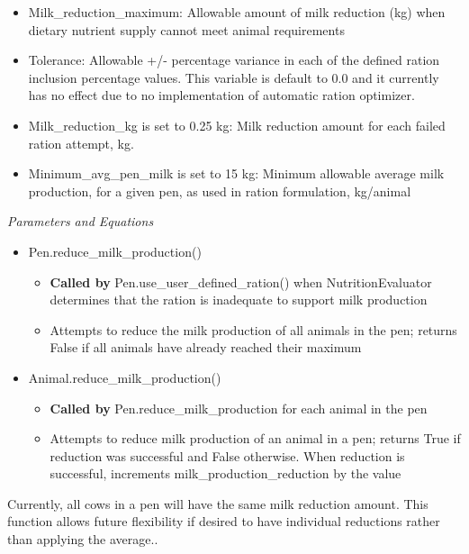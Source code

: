 \documentclass{article}
\begin{document}
\begin{refsection}
\begin{enumerate}
         \begin{itemize}
             \item Milk\_reduction\_maximum: Allowable amount of milk reduction (kg) when dietary nutrient supply cannot meet animal requirements 
             \item Tolerance: Allowable +/- percentage variance in each of the defined ration inclusion percentage values. This variable is default to 0.0 and it currently has no effect due to no implementation of automatic ration optimizer. 
            \item Milk\_reduction\_kg is set to 0.25 kg: Milk reduction amount for each failed ration attempt, kg. 
            \item Minimum\_avg\_pen\_milk is set to 15 kg: Minimum allowable average milk production, for a given pen, as used in ration formulation, kg/animal
         \end{itemize}

         \textit{Parameters and Equations}
         \vspace{0.1cm}

        \begin{itemize}
            \item Pen.reduce\_milk\_production()
            \begin{itemize}
                \item \textbf{Called by} Pen.use\_user\_defined\_ration() when NutritionEvaluator determines that the ration is inadequate to support milk production
                \item Attempts to reduce the milk production of all animals in the pen; returns False if all animals have already reached their maximum 
            \end{itemize}
            \item Animal.reduce\_milk\_production() 
            \begin{itemize}
                \item \textbf{Called by} Pen.reduce\_milk\_production for each animal in the pen 
                \item Attempts to reduce milk production of an animal in a pen; returns True if reduction was successful and False otherwise. When reduction is successful, increments milk\_production\_reduction by the value 
            \end{itemize}
        \end{itemize}


        \begin{tcolorbox}[colback=white, colframe=black, boxrule=0.5pt, arc=3pt, width=\textwidth]
            Currently, all cows in a pen will have the same milk reduction amount. This function allows future flexibility if desired to have individual reductions rather than applying the average..
        \end{tcolorbox}



\end{enumerate}
\end{refsection}
\end{document}
